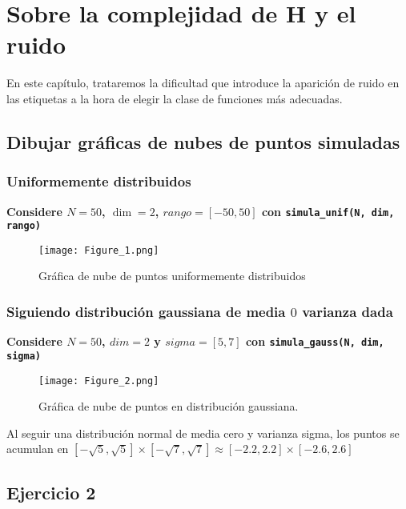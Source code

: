 \chapter{Sobre la complejidad de H y el ruido}

En este capítulo, trataremos la dificultad que introduce la aparición de
ruido en las etiquetas a la hora de elegir la clase de funciones más adecuadas.

\section{Dibujar gráficas de nubes de puntos simuladas}

\subsection{Uniformemente distribuidos}

\textbf{Considere $N = 50$, $\dim = 2$, $rango = [-50, 50]$ con
\texttt{simula_unif(N, dim, rango)}}

\begin{figure}[H]
\centering
\texttt{[image: Figure\_1.png]}
\caption{Gráfica de nube de puntos uniformemente distribuidos}
\end{figure}

\hfill \break

\subsection{Siguiendo distribución gaussiana de media \texorpdfstring{$0$} y varianza dada}

\textbf{Considere $N = 50$, $dim = 2$ y $sigma = [5, 7]$ con 
\texttt{simula_gauss(N, dim, sigma)}}

\begin{figure}[H]
\centering
\texttt{[image: Figure\_2.png]}
\caption{Gráfica de nube de puntos en distribución gaussiana.}
\end{figure}

Al seguir una distribución normal de media cero y varianza sigma, los puntos se
acumulan en $\left[ -\sqrt{5}, \sqrt{5} \right] \times \left[-\sqrt{7}, \sqrt{7}\right]  \approx [-2.2, 2.2] \times [-2.6, 2.6]$

\section{Ejercicio 2}

